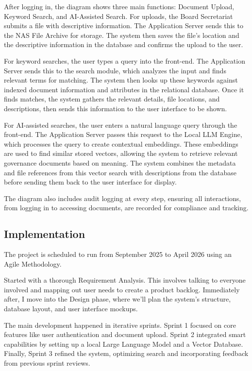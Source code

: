 After logging in, the diagram shows three main functions: Document Upload, Keyword Search, and AI-Assisted Search. For uploads, the Board Secretariat submits a file with descriptive information. The Application Server sends this to the NAS File Archive for storage. The system then saves the file's location and the descriptive information in the database and confirms the upload to the user.

For keyword searches, the user types a query into the front-end. The Application Server sends this to the search module, which analyzes the input and finds relevant terms for matching. The system then looks up these keywords against indexed document information and attributes in the relational database. Once it finds matches, the system gathers the relevant details, file locations, and descriptions, then sends this information to the user interface to be shown.

For AI-assisted searches, the user enters a natural language query through the front-end. The Application Server passes this request to the Local LLM Engine, which processes the query to create contextual embeddings. These embeddings are used to find similar stored vectors, allowing the system to retrieve relevant governance documents based on meaning. The system combines the metadata and file references from this vector search with descriptions from the database before sending them back to the user interface for display.

The diagram also includes audit logging at every step, ensuring all interactions, from logging in to accessing documents, are recorded for compliance and tracking.


\subsection{Implementation}
The project is scheduled to run from September 2025 to April 2026 using an Agile Methodology.

Started with a thorough Requirement Analysis. This involves talking to everyone involved and mapping out user needs to create a product backlog. Immediately after, I move into the Design phase, where we'll plan the system's structure, database layout, and user interface mockups.

The main development happened in iterative sprints. Sprint 1 focused on core features like user authentication and document upload. Sprint 2 integrated smart capabilities by setting up a local Large Language Model and a Vector Database. Finally, Sprint 3 refined the system, optimizing search and incorporating feedback from previous sprint reviews.

